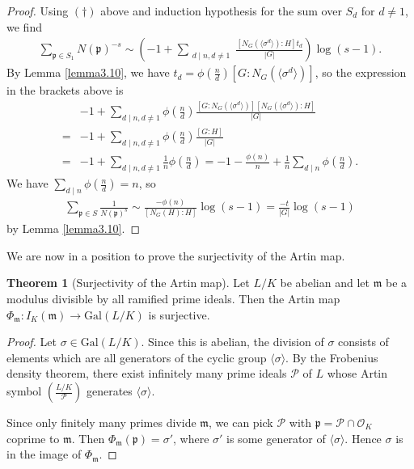 \documentclass{article}
\theoremstyle{definition}
\newtheorem{theorem}{Theorem}[section]
\begin{document}
\begin{proof}
    Using $(\dagger)$ above and induction hypothesis for the sum over $S_d$ for $d \neq 1$, we find 
    \begin{align*}
        [N_G(H):H]\sum_{\mathfrak{p} \in S_1}^{} N(\mathfrak{p})^{-s} \sim \left(-1 + \sum_{\substack{d \mid n, d \neq 1}}^{} \frac{[N_G(\langle \sigma^d \rangle):H]t_d}{\left|G\right|}\right)\log(s-1).
    \end{align*}
    By Lemma \ref{lemma3.10}, we have $t_d = \phi \left(\frac{n}{d}\right) [G:N_G(\langle \sigma^d \rangle)]$, so the expression in the brackets above is
    \begin{align*}
        &-1 + \sum_{d \mid n, d \neq 1}^{} \phi \left(\frac{n}{d}\right)\frac{[G:N_G(\langle \sigma^d \rangle)][N_G(\langle \sigma^d \rangle):H]}{\left|G\right|} \\
        =& -1 + \sum_{d \mid n, d \neq 1}^{} \phi \left(\frac{n}{d}\right)\frac{[G:H]}{\left|G\right|} \\
        =& -1 + \sum_{d \mid n, d\neq 1}^{} \frac{1}{n} \phi \left(\frac{n}{d}\right) = -1 - \frac{\phi(n)}{n} + \frac{1}{n}\sum_{d \mid n}^{} \phi \left(\frac{n}{d}\right).
    \end{align*}
    We have $\sum_{d \mid n}^{} \phi \left(\frac{n}{d}\right) = n$, so 
    \begin{align*}
        \sum_{\mathfrak{p} \in S}^{} \frac{1}{N(\mathfrak{p})^s} \sim \frac{-\phi(n)}{[N_G(H):H]}\log(s-1) = \frac{-t}{\left|G\right|}\log(s-1)
    \end{align*}
    by Lemma \ref{lemma3.10}.
\end{proof}
We are now in a position to prove the surjectivity of the Artin map.
\begin{theorem}[Surjectivity of the Artin map]\label{theorem3.12}
    Let $L/K$ be abelian and let $\mathfrak{m}$ be a modulus divisible by all ramified prime ideals. Then the Artin map $\Phi_{\mathfrak{m}}: I_K(\mathfrak{m}) \to \text{Gal}(L/K)$ is surjective.
\end{theorem}
\begin{proof}
    Let $\sigma \in \text{Gal}(L/K)$. Since this is abelian, the division of $\sigma$ consists of elements which are all generators of the cyclic group $\langle \sigma \rangle$. By the Frobenius density theorem, there exist infinitely many prime ideals $\mathcal{P}$ of $L$ whose Artin symbol $\left(\frac{L/K}{\mathcal{P}}\right)$ generates $\langle \sigma \rangle$.
    \vspace{1mm}
     
    Since only finitely many primes divide $\mathfrak{m}$, we can pick $\mathcal{P}$ with $\mathfrak{p} = \mathcal{P} \cap \mathcal{O}_K$ coprime to $\mathfrak{m}$. Then $\Phi_{\mathfrak{m}}(\mathfrak{p}) = \sigma'$, where $\sigma'$ is some generator of $\langle \sigma \rangle$. Hence $\sigma$ is in the image of $\Phi_{\mathfrak{m}}$.
\end{proof}
\end{document}
